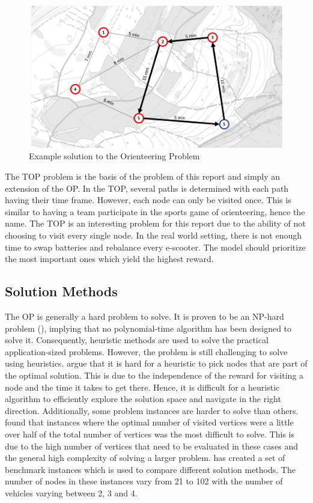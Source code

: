 \begin{figure}[h]
    \centering
    \includegraphics[width=12cm]{Images/TOP.png}
    \caption{Example solution to the Orienteering Problem}
    \label{fig:TOP}
\end{figure}
\break
The TOP problem is the basis of the problem of this report and simply an extension of the OP. In the TOP, several paths is determined with each path having their time frame. However, each node can only be visited once. This is similar to having a team participate in the sports game of orienteering, hence the name. The TOP is an interesting problem for this report due to the ability of not choosing to visit every single node. In the real world setting, there is not enough time to swap batteries and rebalance every e-scooter. The model should prioritize the most important ones which yield the highest reward. 

\subsection{Solution Methods}\label{lit_solution_methods}

The OP is generally a hard problem to solve. It is proven to be an NP-hard problem (\cite{golden_orienteering_1987}), implying that no polynomial-time algorithm has been designed to solve it. Consequently, heuristic methods are used to solve the practical application-sized problems. However, the problem is still challenging to solve using heuristics. \citet{gendreau_tabu_1998} argue that it is hard for a heuristic to pick nodes that are part of the optimal solution. This is due to the independence of the reward for visiting a node and the time it takes to get there. Hence, it is difficult for a heuristic algorithm to efficiently explore the solution space and navigate in the right direction. Additionally, some problem instances are harder to solve than others. \citet{vansteenwegen_iterated_2009} found that instances where the optimal number of visited vertices were a little over half of the total number of vertices was the most difficult to solve. This is due to the high number of vertices that need to be evaluated in these cases and the general high complexity of solving a larger problem. \citet{chao_team_1996} has created a set of benchmark instances which is used to compare different solution methods. The number of nodes in these instances vary from 21 to 102 with the number of vehicles varying between 2, 3 and 4.

